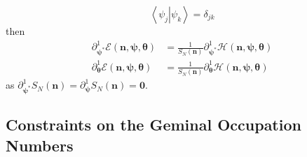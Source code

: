 \documentclass[aps,preprint]{revtex4}%
\begin{document}
\begin{equation}
\left\langle \left.  \psi_{j}\right\vert \psi_{k}\right\rangle =\delta_{jk}%
\end{equation}
then
\begin{align}
\partial_{\mathbf{\psi}^{\ast}}^{1}\mathcal{E}\left(  \mathbf{n},\mathbf{\psi
},\mathbf{\theta}\right)   &  =\frac{1}{S_{N}\left(  \mathbf{n}\right)
}\partial_{\mathbf{\psi}^{\ast}}^{1}\mathcal{H}\left(  \mathbf{n}%
,\mathbf{\psi},\mathbf{\theta}\right) \\
\partial_{\mathbf{\theta}}^{1}\mathcal{E}\left(  \mathbf{n},\mathbf{\psi
},\mathbf{\theta}\right)   &  =\frac{1}{S_{N}\left(  \mathbf{n}\right)
}\partial_{\mathbf{\theta}}^{1}\mathcal{H}\left(  \mathbf{n},\mathbf{\psi
},\mathbf{\theta}\right)
\end{align}
as $\partial_{\mathbf{\psi}^{\ast}}^{1}S_{N}\left(  \mathbf{n}\right)
=\partial_{\mathbf{\psi}}^{1}S_{N}\left(  \mathbf{n}\right)  =\mathbf{0}$.

\subsection{Constraints on the Geminal Occupation Numbers}
\end{document}
